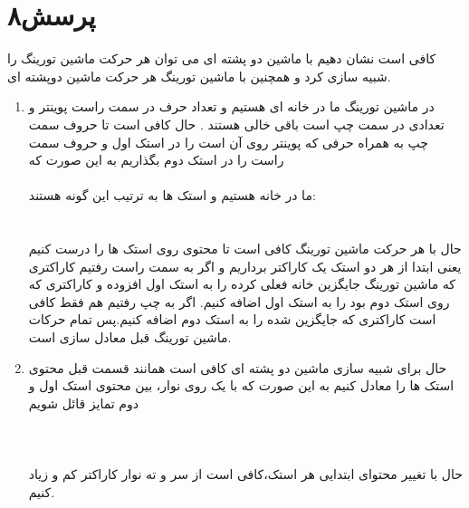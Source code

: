 \documentclass[a4paper]{article}
\begin{document}
\section*{پرسش۸}
کافی است نشان دهیم با ماشین دو پشته ای می توان هر حرکت ماشین تورینگ را شبیه سازی کرد و همچنین با ماشین تورینگ هر حرکت ماشین دوپشته ای.\\
\begin{enumerate}
\item{}
در ماشین تورینگ ما در خانه ای هستیم و تعداد حرف در سمت راست پوینتر و تعدادی در سمت چپ است باقی خالی هستند
.
حال کافی است تا حروف سمت چپ به همراه حرفی که پوینتر روی آن است را در استک اول و حروف سمت راست را در استک دوم بگذاریم به این صورت که\\
\\
ما در خانه
\lr{*}
هستیم و استک ها به ترتیب این گونه هستند:\\
\\
\\
حال با هر حرکت ماشین تورینگ کافی است تا محتوی روی استک ها را درست کنیم یعنی ابتدا از هر دو استک یک کاراکتر برداریم و اگر به سمت راست رفتیم کاراکتری که ماشین تورینگ جایگزین خانه فعلی کرده را به استک اول افزوده و کاراکتری که روی استک دوم بود را به استک اول اضافه کنیم. اگر به چپ رفتیم هم فقط کافی است کاراکتری که جایگزین شده را به استک دوم اضافه کنیم.پس تمام حرکات ماشین تورینگ قبل معادل سازی است.\\
\item{}
حال برای شبیه سازی ماشین دو پشته ای کافی است همانند قسمت قبل محتوی استک ها را معادل کنیم به این صورت که با یک 
\lr{\#}
روی نوار، بین محتوی استک اول و دوم تمایز قائل شویم\\
\\
\\
\\
حال با تغییر محتوای ابتدایی هر استک،کافی است از سر و ته نوار کاراکتر کم و زیاد کنیم.
\end{enumerate}
\pagebreak
\end{document}
